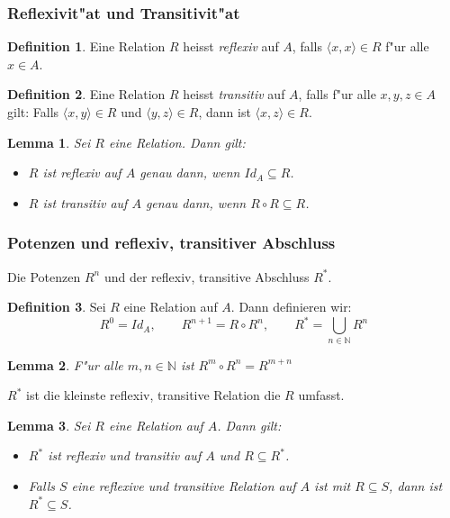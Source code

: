 \documentclass[german,10pt, a4paper, twocolumn]{scrartcl}
\newtheorem{lemma}{Lemma}[section]
\theoremstyle{definition}
\newtheorem{definition}{Definition}[section]
\theoremstyle{remark}
\begin{document}
\subsubsection{Reflexivit"at und Transitivit"at}

\begin{definition}
	Eine Relation $R$ heisst \textit{reflexiv} auf $A$, falls $\langle x,x \rangle \in R$ f"ur alle $x\in A$.
\end{definition}

\begin{definition}
	Eine Relation $R$ heisst \textit{transitiv} auf $A$, falls f"ur alle $x,y,z \in A$ gilt: Falls $\langle x,y \rangle\in R$ und $\langle y,z\rangle \in R$, dann ist $\langle x,z \rangle \in R$.
\end{definition}

\begin{lemma}
	Sei $R$ eine Relation. Dann gilt:
	\begin{itemize}
		\item $R$ ist reflexiv auf $A$ genau dann, wenn $Id_A \subseteq R$.
		\item $R$ ist transitiv auf $A$ genau dann, wenn $R\circ R \subseteq R$.
	\end{itemize}
\end{lemma}

\subsubsection{Potenzen und reflexiv, transitiver Abschluss}

Die Potenzen $R^n$ und der reflexiv, transitive Abschluss $R^*$.

\begin{definition}
	Sei $R$ eine Relation auf $A$. Dann definieren wir:
	\begin{displaymath}
		R^0 = Id_A, \qquad	R^{n+1}=R\circ R^n, \qquad	R^* = \bigcup_{n\in \mathbb{N}} R^n
	\end{displaymath}
\end{definition}

\begin{lemma}
	F"ur alle $m,n \in \mathbb{N}$ ist $R^m\circ R^n = R^{m+n}$
\end{lemma}

$R^*$ ist die kleinste reflexiv, transitive Relation die $R$ umfasst.
\begin{lemma}
	Sei $R$ eine Relation auf $A$. Dann gilt:
	\begin{itemize}
		\item $R^*$ ist reflexiv und transitiv auf $A$ und $R\subseteq R^*$.
		\item Falls $S$ eine reflexive und transitive Relation auf $A$ ist mit $R\subseteq S$, dann ist $R^* \subseteq S$.
	\end{itemize}
\end{lemma}
\end{document}
